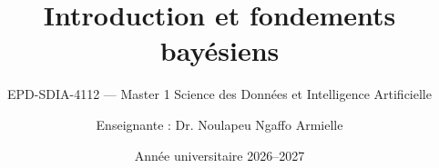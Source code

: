 
\title[Chapitre 1 --- Introduction et fondements bayésiens]{Introduction et fondements bayésiens}
\subtitle{EPD-SDIA-4112 --- Master 1 Science des Données et Intelligence Artificielle}
\author{Enseignante : Dr. Noulapeu Ngaffo Armielle}
\date{Année universitaire 2026--2027}








